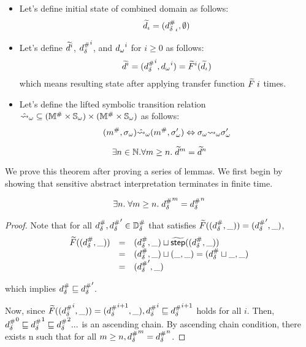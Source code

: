 \begin{itemize}
\item
Let's define initial state of combined domain as follows:
\[
  \widetilde{d}_\iota = ({{d}^{\#}_\delta}_\iota, \emptyset)
\]
\item
Let's define $\widetilde{d}^i$, ${{d}^{\#}_\delta}^i$, and ${{d}_\omega}^i$ for $i \geq 0$ as follows:
\[
  \widetilde{d}^i = ({{d}^{\#}_\delta}^i, {{d}_\omega}^i) = \widetilde{F}^i(\widetilde{d}_\iota)
\]
which means resulting state after applying transfer function $\widetilde{F} \; i$ times.
\item
Let's define the lifted symbolic transition relation
$\hat{\leadsto}_\omega \subseteq
({\mathbb{M}}^{\#} \times {\mathbb{S}}_\omega) \times ({\mathbb{M}}^{\#} \times {\mathbb{S}}_\omega)$
as follows:
\[
  ({m}^{\#}, {\sigma}_\omega) \hat{\leadsto}_\omega ({m}^{\#}, {\sigma}_\omega') \Leftrightarrow
  {\sigma}_\omega {\leadsto}_\omega {\sigma}_\omega'
\]
\end{itemize}

\begin{theorem}[Termination]\label{theorem:termination}
  \[
    \exists n \in \mathbb{N}. \forall m \geq n. \;
    \widetilde{d}^m = \widetilde{d}^n
  \]
\end{theorem}

We prove this theorem after proving a series of lemmas.
We first begin by showing that sensitive abstract interpretation terminates in
finite time.

\begin{lemma}\label{lemma:sabs-term}
\label{theorem:sabs-termination}
  \[
    \exists n. \; \forall m \geq n. \;
    {{d}^{\#}_\delta}^m = {{d}^{\#}_\delta}^n
  \]
\end{lemma}

\begin{proof}
Note that for all ${{d}^{\#}_\delta}, {{d}^{\#}_\delta}' \in {\mathbb{D}}^{\#}_\delta$ that satisfies
$\widetilde{F}(({{d}^{\#}_\delta}, \_)) = ({{d}^{\#}_\delta}', \_)$,
\[
  \begin{array}{rcl}
  \widetilde{F}(({{d}^{\#}_\delta}, \_))
  &=& ({{d}^{\#}_\delta}, \_) \sqcup \widetilde{\textsf{step}}(({{d}^{\#}_\delta}, \_))\\
  &=& ({{d}^{\#}_\delta}, \_) \sqcup (\_, \_) = ({{d}^{\#}_\delta} \sqcup \_, \_)\\
  &=& ({{d}^{\#}_\delta}', \_)
  \end{array}
\]

which implies ${{d}^{\#}_\delta} \sqsubseteq {{d}^{\#}_\delta}'$.

Now, since $\widetilde{F}(({{d}^{\#}_\delta}^i, \_)) = ({{d}^{\#}_\delta}^{i+1}, \_),
{{d}^{\#}_\delta}^i \sqsubseteq {{d}^{\#}_\delta}^{i+1}$ holds for all $i$.
Then, ${{d}^{\#}_\delta}^0 \sqsubseteq {{d}^{\#}_\delta}^1 \sqsubseteq {{d}^{\#}_\delta}^2 ...$ is an ascending chain.
By ascending chain condition, there exists n such that
for all $m \geq n, {{d}^{\#}_\delta}^m = {{d}^{\#}_\delta}^n$.
\end{proof}

